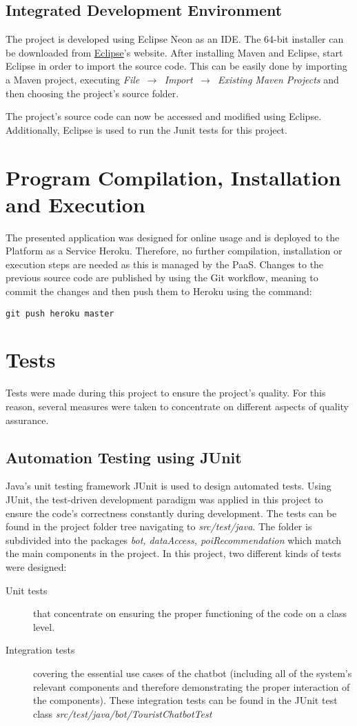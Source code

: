 \subsection{Integrated Development Environment}
The project is developed using Eclipse Neon as an IDE. The 64-bit installer can be downloaded from \hyperlink{https://www.eclipse.org/downloads/}{Eclipse}'s website. 
After installing Maven and Eclipse, start Eclipse in order to import the source code. This can be easily done by importing a Maven project, executing \textit{File $\,\to\,$ Import $\,\to\,$ Existing Maven Projects} and then choosing the project's source folder.
 
The project’s source code can now be accessed and modified using Eclipse. Additionally, Eclipse is used to run the Junit tests for this project.

\section{Program Compilation, Installation and Execution}
The presented application was designed for online usage and is deployed to the Platform as a Service Heroku.  Therefore, no further compilation, installation or execution steps are needed as this is managed by the PaaS. Changes to the previous source code are published by using the Git workflow, meaning to commit the changes and then push them to Heroku using the command:
\begin{lstlisting}
git push heroku master
\end{lstlisting}

\section{Tests}
Tests were made during this project to ensure the project’s quality. For this reason, several measures were taken to concentrate on different aspects of quality assurance. 

\subsection{Automation Testing using JUnit}
Java’s unit testing framework JUnit is used to design automated tests. Using JUnit, the test-driven development paradigm was applied in this project to ensure the code’s correctness constantly during development. The tests can be found in the project folder tree navigating to \textit{src/test/java}. The folder is subdivided into the packages \textit{bot, dataAccess, poiRecommendation} which match the main components in the project. In this project, two different kinds of tests were designed:
\begin{description}
\item[Unit tests] that concentrate on ensuring the proper functioning of the code on a class level. 
\item[Integration tests] covering the essential use cases of the chatbot (including all of the system’s relevant components and therefore demonstrating the proper interaction of the components). These integration tests can be found in the JUnit test class \textit{src/test/java/bot/TouristChatbotTest}
\end{description}

